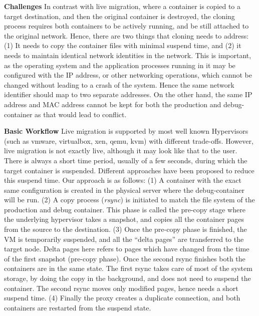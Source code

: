 \textbf{Challenges }
In contrast with live migration, where a container is copied to a target destination, and then the original container is destroyed, the cloning process requires both containers to be actively running, and be still attached to the original network.
Hence, there are two things that cloning needs to address: (1) It needs to copy the container files with minimal suspend time, and (2) it needs to maintain identical network identities in the network.
This is important, as the operating system and the application processes running in it may be configured with the IP address, or other networking operations, which cannot be changed without leading to a crash of the system.
Hence the same network identifier should map to two separate addresses.
On the other hand, the same IP address and MAC address cannot be kept for both the production and debug-container as that would lead to conflict. 


\textbf{Basic Workflow }
Live migration is supported by most well known Hypervisors (such as vmware, virtualbox, xen, qemu, kvm) with different trade-offs.
However, live migration is not exactly live, although it may look like that to the user. 
There is always a short time period, usually of a few seconds, during which the target container is suspended.
Different approaches have been proposed to reduce this suspend time. 
Our approach is as follows:
(1) A container with the exact same configuration is created in the physical server where the debug-container will be run.
(2) A copy process (\textit{rsync}) is initiated to match the file system of the production and debug container. This phase is called the pre-copy stage where the underlying hypervisor takes a snapshot, and copies all the container pages from the source to the destination. 
(3) Once the pre-copy phase is finished, the VM is temporarily suspended, and all the ``delta pages'' are transferred to the target node. Delta pages here refers to pages which have changed from the time of the first snapshot (pre-copy phase).
Once the second rsync finishes both the containers are in the same state. 
The first rsync takes care of most of the system storage, by doing the copy in the background, and does not need to suspend the container. The second rsync moves only modified pages, hence needs a short suspend time.
(4) Finally the proxy creates a duplicate connection, and both containers are restarted from the suspend state.


